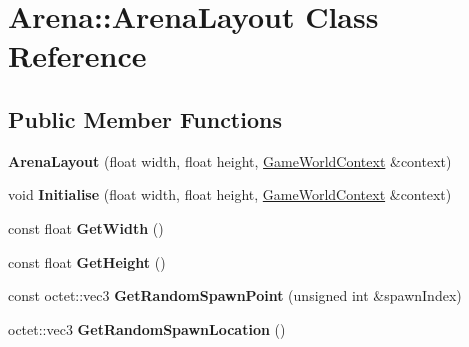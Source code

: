\hypertarget{class_arena_1_1_arena_layout}{\section{Arena\+:\+:Arena\+Layout Class Reference}
\label{class_arena_1_1_arena_layout}
}
\subsection*{Public Member Functions}
\begin{DoxyCompactItemize}
\item 
\hypertarget{class_arena_1_1_arena_layout_a0ee525e5d8030b48366e567d509fccf3}{{\bfseries Arena\+Layout} (float width, float height, \hyperlink{struct_arena_1_1_game_world_context}{Game\+World\+Context} \&context)}\label{class_arena_1_1_arena_layout_a0ee525e5d8030b48366e567d509fccf3}

\item 
\hypertarget{class_arena_1_1_arena_layout_ab5853b22eb396c79064de55b57749d3c}{void {\bfseries Initialise} (float width, float height, \hyperlink{struct_arena_1_1_game_world_context}{Game\+World\+Context} \&context)}\label{class_arena_1_1_arena_layout_ab5853b22eb396c79064de55b57749d3c}

\item 
\hypertarget{class_arena_1_1_arena_layout_a99195cea977dee42a76227fc8c0300c2}{const float {\bfseries Get\+Width} ()}\label{class_arena_1_1_arena_layout_a99195cea977dee42a76227fc8c0300c2}

\item 
\hypertarget{class_arena_1_1_arena_layout_a82660c66b1ffa0c680a7ddf151a38e67}{const float {\bfseries Get\+Height} ()}\label{class_arena_1_1_arena_layout_a82660c66b1ffa0c680a7ddf151a38e67}

\item 
\hypertarget{class_arena_1_1_arena_layout_a014787a7f117c1aa043dbadf13f82c64}{const octet\+::vec3 {\bfseries Get\+Random\+Spawn\+Point} (unsigned int \&spawn\+Index)}\label{class_arena_1_1_arena_layout_a014787a7f117c1aa043dbadf13f82c64}

\item 
\hypertarget{class_arena_1_1_arena_layout_a426a1af8d6587ea56d21822ca807df0d}{octet\+::vec3 {\bfseries Get\+Random\+Spawn\+Location} ()}\label{class_arena_1_1_arena_layout_a426a1af8d6587ea56d21822ca807df0d}

\end{DoxyCompactItemize}
